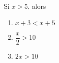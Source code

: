 
\begin{mental}
    
Si \( x>5\), alors
\begin{enumerate}
    \item
        \( x+3<x+5\)
    \item
        \( \dfrac{ x }{ 2 }>10\)
    \item
        \( 2x>10\)
\end{enumerate}
\end{mental}
